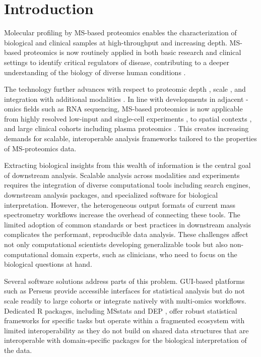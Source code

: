 \documentclass[pdflatex,sn-nature]{sn-jnl}%
\theoremstyle{thmstyleone}%
\theoremstyle{thmstyletwo}%
\theoremstyle{thmstylethree}%
\begin{document}

\maketitle

\section{Introduction}\label{sec:introduction}
Molecular profiling by MS-based proteomics enables the characterization of biological and clinical samples at high-throughput and increasing depth.
MS-based proteomics is now routinely applied in both basic research and clinical settings to identify critical regulators of disease, contributing to a deeper understanding of the biology of diverse human conditions \cite{Nordmann.2024,Rosenberger.2025}. \smallskip

The technology further advances with respect to proteomic depth \cite{Rosenberger.2023}, scale \cite{Albrecht.2025,Niu.2025}, and integration with additional modalities \cite{Fulcher.2024,Mund.2022,Zheng.2025a}.
In line with developments in adjacent -omics fields such as RNA sequencing, MS-based proteomics is now applicable from highly resolved low-input and single-cell experiments \cite{Rosenberger.2023,Slavov.2026,Gatto.2023}, to spatial contexts \cite{NatureMethods.2024}, and large clinical cohorts including plasma proteomics \cite{Bader.2023}. This creates increasing demands for scalable, interoperable analysis frameworks tailored to the properties of MS-proteomics data.
\smallskip

Extracting biological insights from this wealth of information is the central goal of downstream analysis.
Scalable analysis across modalities and experiments requires the integration of diverse computational tools including search engines, downstream analysis packages, and specialized software for biological interpretation.
However, the heterogeneous output formats of current mass spectrometry workflows increase the overhead of connecting these tools.
The limited adoption of common standards or best practices in downstream analysis complicates the performant, reproducible data analysis.
These challenges affect not only computational scientists developing generalizable tools but also non-computational domain experts, such as clinicians, who need to focus on the biological questions at hand.
\smallskip

Several software solutions address parts of this problem.
GUI-based platforms such as Perseus \cite{Tyanova.2018} provide accessible interfaces for statistical analysis but do not scale readily to large cohorts or integrate natively with multi-omics workflows.
Dedicated R packages, including MSstats \cite{Choi.2014,Kohler.2023} and DEP \cite{Zhang.2018a}, %
offer robust statistical frameworks for specific tasks but operate within a fragmented ecosystem with limited interoperability as they do not build on shared data structures that are interoperable with domain-specific packages for the biological interpretation of the data.
\smallskip
\end{document}
